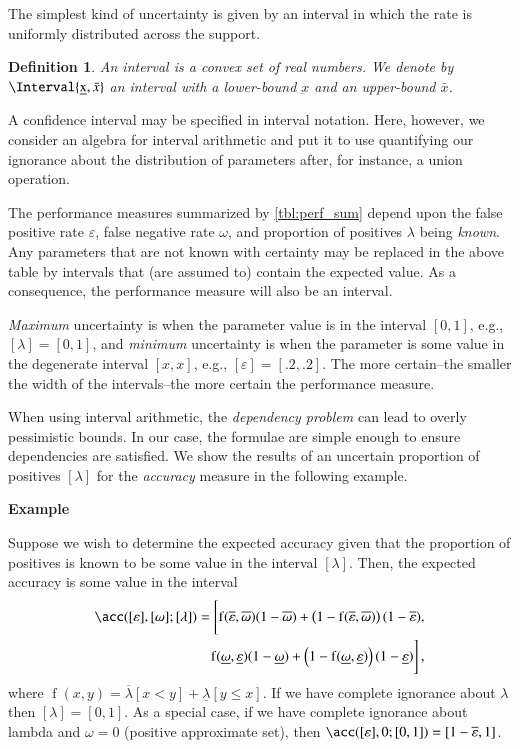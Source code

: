 \documentclass[10pt,final,hidelinks]{article}
\numberwithin{equation}{section}
\newcommand{\fprate}{\varepsilon}
\newcommand{\fnrate}{\omega}
\newcommand{\envnumstyle}{chapter}
\renewcommand{\envnumstyle}{chapter}
\renewcommand{\envnumstyle}{section}
\theoremstyle{plain}
\newtheorem{definition}{Definition}[\envnumstyle]
\newcounter{examplecounter}
\newenvironment{example}
{
    \refstepcounter{examplecounter}%
    \par\vspace{\baselineskip}\noindent 
    \textbf{Example \theexamplecounter}%
    \begin{itshape}
    \quad
}
{
    \end{itshape}
    \par\vspace{\baselineskip}%
    \noindent\ignorespacesafterend     
}
\begin{document}
The simplest kind of uncertainty is given by an interval in which the rate is uniformly distributed across the support.
\begin{definition}
An interval is a convex set of real numbers.
We denote by $\Interval{\underbar{x},\bar{x}}$ an interval with a lower-bound $\underbar{x}$ and an upper-bound $\bar{x}$.
\end{definition}

A confidence interval may be specified in interval notation.
Here, however, we consider an algebra for interval arithmetic and put it to use quantifying our ignorance about the distribution of parameters after, for instance, a union operation.

The performance measures summarized by \cref{tbl:perf_sum} depend upon the false positive rate $\fprate$, false negative rate $\fnrate$, and proportion of positives $\lambda$ being \emph{known}.
Any parameters that are not known with certainty may be replaced in the above table by intervals that (are assumed to) contain the expected value.
As a consequence, the performance measure will also be an interval.

\emph{Maximum} uncertainty is when the parameter value is in the interval $[0,1]$, e.g., $[\lambda] = [0,1]$, and \emph{minimum} uncertainty is when the parameter is some value in the degenerate interval $[x,x]$, e.g., $[\fprate] = [.2,.2]$. The more certain--the smaller the width of the intervals--the more certain the performance measure.

When using interval arithmetic, the \emph{dependency problem} can lead to overly pessimistic bounds.
In our case, the formulae are simple enough to ensure dependencies are satisfied. We show the results of an uncertain proportion of positives $[\lambda]$ for the \emph{accuracy} measure in the following example.

\begin{example}
	Suppose we wish to determine the expected accuracy given that the proportion of positives is known to be some value in the interval 
	$[\lambda]$. Then, the expected accuracy is some value in the interval
	\begin{equation}
		\begin{split}
		\acc([\fprate],[\fnrate] ; [\lambda]) =
		\biggl[
		\operatorname{f}(\overline{\fprate},\overline{\fnrate})(1-\overline{\fnrate}) + 
		\left(1-\operatorname{f}(\overline{\fprate},\overline{\fnrate})\right)(1-\overline{\fprate}),\\
		\operatorname{f}(\underline{\fnrate},\underline{\fprate})(1-\underline{\fnrate}) + 
		\left(1-\operatorname{f}(\underline{\fnrate},\underline{\fprate})\right)(1-\underline{\fprate})
		\biggr]\,,
		\end{split}
		\end{equation}
		where $\operatorname{f}(x,y) = \overline{\lambda}[x < y] + 
		\underline{\lambda}[y \leq x]$. If we have complete ignorance about 
		$\lambda$ then $[\lambda] = [0,1]$. As a special case, if we have 
		complete 
		ignorance about lambda and $\fnrate = 0$ (positive approximate set), 
		then 
		$\acc([\fprate],0 ; [0,1]) = [1-\overline{\fprate}, 1]$.
\end{example}
\end{document}
